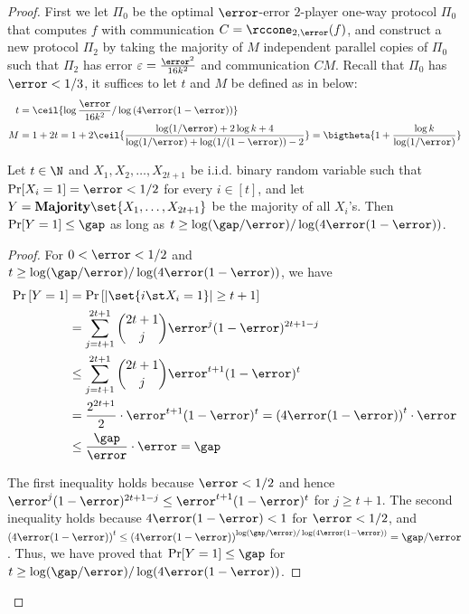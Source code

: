 \begin{proof}


First we let $\Pi_0$ be the optimal $\error$-error $2$-player one-way protocol $\Pi_0$ that computes $f$ with communication $C=\rccone_{2,\error}(f)$,
and construct a new protocol $\Pi_2$ by taking 
the majority of $M$ independent parallel copies of $\Pi_0$ such that $\Pi_2$ has error $\varepsilon = \frac{\error^2}{16k^2}$ and communication ${C M}$.
Recall that $\Pi_0$ has $\error<1/3$,  it suffices to let $t$ and $M$ be defined as in  below:
\begin{align}\label{equ:M}
t &= \ceil{\log\frac{\error}{16k^2}/\log\left(4\error(1-\error) \right)}\\
M &=1+2t=1+2\ceil{\frac{\log(1/\error)+2\log k+4}{\log(1/\error)+\log(1/(1-\error))-2}}=\bigtheta{1+\frac{\log k}{\log(1/\error)}}	
\end{align}


\begin{lemma}\label{lemma:amp}
Let $t\in \N$ and $X_1,X_2,\dots, X_{2t+1}$ be i.i.d. binary random variable such that $\Pr[X_i=1]=\error<1/2$ for every $i\in[t]$,
and let $Y=\mathbf{Majority}\set{X_1,\dots, X_{2t+1}}$ be the majority of all $X_i$'s.
Then $\Pr[Y=1]\le \gap$ as long as $t\ge \log(\gap/\error)/\log(4\error(1-\error))$.	
\end{lemma}

\begin{proof}
For $0<\error<1/2$ and $t\ge \log(\gap/\error)/\log(4\error(1-\error))$,
we have 
\begin{align*}
	\Pr\left[ Y=1 \right] &= \Pr\left[ |\set{i\st X_i=1}|\ge t+1 \right]
	\\
	&= \sum_{j=t+1}^{2t+1} \binom{2t+1}{j} \error^j(1-\error)^{2t+1-j}\\
	&\le \sum_{j=t+1}^{2t+1} \binom{2t+1}{j} \error^{t+1}(1-\error)^{t}\\
	&=\frac{2^{2t+1}}{2} \cdot \error^{t+1}(1-\error)^{t}
	=\left( 4\error(1-\error) \right)^t \cdot\error\\
	&\le \frac{\gap}{\error} \cdot\error =\gap
\end{align*}


The first inequality holds because $\error<1/2$ and hence $\error^j(1-\error)^{2t+1-j}\le \error^{t+1}(1-\error)^{t}$ for $j\ge t+1$.	
The second inequality holds because $4\error(1-\error)<1$ for $\error<1/2$, and $\left( 4\error(1-\error) \right)^t\le \left( 4\error(1-\error) \right)^{\log(\gap/\error)/\log(4\error(1-\error))} = \gap/\error$. 
Thus, we have proved that $\Pr[Y=1]\le \gap$ for $t \ge {\log(\gap/\error)/\log(4\error(1-\error))}$.
\end{proof}



\end{proof}
